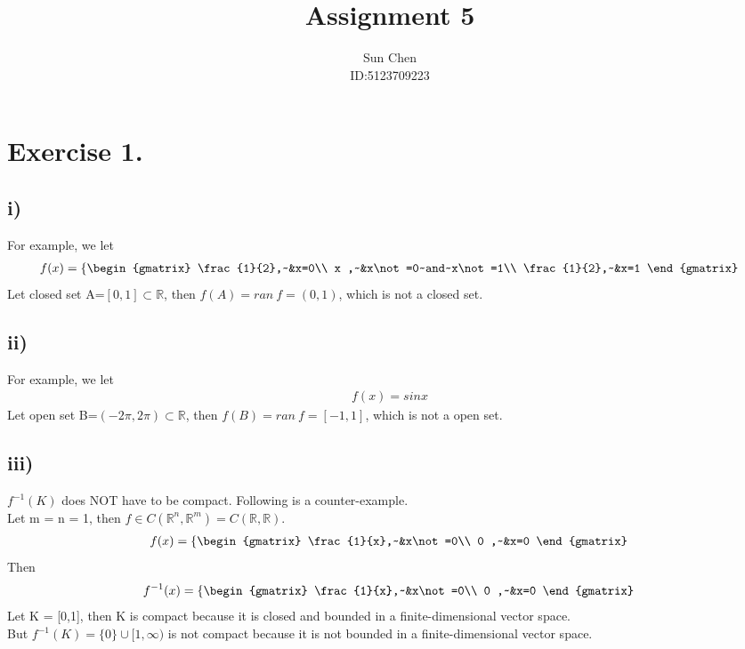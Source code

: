 \documentclass{article}
\title{Assignment 5}
\author{Sun Chen\\ ID:5123709223}
\begin{document}
\maketitle

\section*{Exercise 1.}
\subsection*{i)}
For example, we let
\begin{align*}
f(x)=
\left\lbrace  \begin{gmatrix}
		   \frac{1}{2},~&x=0\\
		   x ,~&x\not=0~and~x\not=1\\
		   \frac{1}{2},~&x=1
\end{gmatrix}\right.\\
\end{align*}
Let closed set A=$[0,1]\subset \mathbb{R}$, then $f(A)=ran~f=(0,1)$, which is not a closed set.

\subsection*{ii)}
For example, we let
\begin{align*}
f(x)=sinx
\end{align*}
Let open set B=$(-2\pi,2\pi)\subset \mathbb{R}$, then $f(B)=ran~f=[-1,1]$, which is not a open set.

\subsection*{iii)}
$f^{-1}(K)$ does NOT have to be compact.
Following is a counter-example.\\
Let m = n = 1, then $f\in C(\mathbb{R}^n,\mathbb{R}^m)=C(\mathbb{R},\mathbb{R})$.
\begin{align*}
f(x)=
\left\lbrace  \begin{gmatrix}
		   \frac{1}{x},~&x\not=0\\
		   0 ,~&x=0
\end{gmatrix}\right.\\
\end{align*}
Then 
\begin{align*}
f^{-1}(x)=
\left\lbrace  \begin{gmatrix}
		   \frac{1}{x},~&x\not=0\\
		   0 ,~&x=0
\end{gmatrix}\right.\\
\end{align*}
Let K = [0,1], then K is compact because it is closed and bounded in a finite-dimensional vector space.\\
But $f^{-1}(K)=\lbrace0\rbrace\cup[1,\infty)$ is not compact because it is not bounded in a finite-dimensional vector space.
\end{document}
